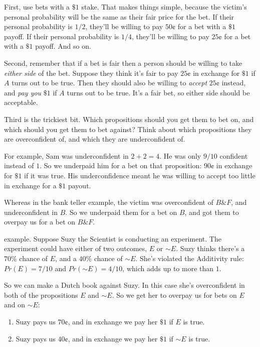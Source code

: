 \documentclass[justified]{tufte-book}
\providecommand{\tightlist}{%
  \setlength{\itemsep}{0pt}\setlength{\parskip}{0pt}}
\renewcommand{\neg}{\mathbin{\sim}}
\renewcommand{\wedge}{\mathbin{\&}}
\newcommand{\p}{Pr}
\theoremstyle{definition}
\theoremstyle{definition}
\theoremstyle{definition}
\theoremstyle{remark}
\begin{document}
First, use bets with a \(\$1\) stake. That makes things simple, because the victim's personal probability will be the same as their fair price for the bet. If their personal probability is \(1/2\), they'll be willing to pay \(50\)¢ for a bet with a \(\$1\) payoff. If their personal probability is \(1/4\), they'll be willing to pay \(25\)¢ for a bet with a \(\$1\) payoff. And so on.

Second, remember that if a bet is fair then a person should be willing to take \emph{either side} of the bet. Suppose they think it's fair to pay \(25\)¢ in exchange for \(\$1\) if \(A\) turns out to be true. Then they should also be willing to \emph{accept} \(25\)¢ instead, and \emph{pay you} \(\$1\) if \(A\) turns out to be true. It's a fair bet, so either side should be acceptable.

Third is the trickiest bit. Which propositions should you get them to bet on, and which should you get them to bet against? Think about which propositions they are overconfident of, and which they are underconfident of.

For example, Sam was underconfident in \(2+2=4\). He was only \(9/10\) confident instead of \(1\). So we underpaid him for a bet on that proposition: \(90\)¢ in exchange for \(\$1\) if it was true. His underconfidence meant he was willing to accept too little in exchange for a \(\$1\) payout.

Whereas in the bank teller example, the victim was overconfident of \(B \wedge F\), and underconfident in \(B\). So we underpaid them for a bet on \(B\), and got them to overpay us for a bet on \(B \wedge F\).

 example. Suppose Suzy the Scientist is conducting an experiment. The experiment could have either of two outcomes, \(E\) or \(\neg E\). Suzy thinks there's a \(70\%\) chance of \(E\), and a \(40\%\) chance of \(\neg E\). She's violated the Additivity rule: \(\p(E) = 7/10\) and \(\p(\neg E) = 4/10\), which adds up to more than \(1\).

So we can make a Dutch book against Suzy. In this case she's overconfident in both of the propositions \(E\) and \(\neg E\). So we get her to overpay us for bets on \(E\) and on \(\neg E\):

\begin{enumerate}
\def\labelenumi{\arabic{enumi}.}
\tightlist
\item
  Suzy pays us \(70\)¢, and in exchange we pay her \(\$1\) if \(E\) is true.
\item
  Suzy pays us \(40\)¢, and in exchange we pay her \(\$1\) if \(\neg E\) is true.
\end{enumerate}
\end{document}
